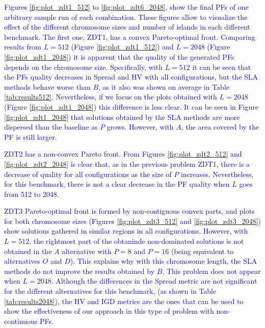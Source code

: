 \documentclass[preprint]{elsarticle}
\begin{document}
\textcolor{blue}{Figures \ref{fig:plot_zdt1_512} to
  \ref{fig:plot_zdt6_2048}, show the final PFs of one arbitrary sample
  run of each combination. %
  These figures allow to visualize the effect of the different
  chromosome sizes and number of islands in each different
  benchmark. The first one, ZDT1, has a convex Pareto-optimal
  front. Comparing results from $L=512$ (Figure
  \ref{fig:plot_zdt1_512}) and $L=2048$ (Figure
  \ref{fig:plot_zdt1_2048}) it is apparent that the quality of the
  generated PFs depends on the chromosome size. Specifically, with
  $L=512$ it can be seen that the PFs quality decreases in Spread and
  HV with all configurations, but the SLA methods behave worse than
  $B$, as it also was shown on average in Table
  \ref{tab:results512}. %
  Nevertheless, if we focus on the plots obtained with $L=2048$
  (Figure \ref{fig:plot_zdt1_2048}) this difference is less clear. It
  can be seen in Figure \ref{fig:plot_zdt1_2048} that solutions
  obtained by the SLA methods are more dispersed than the baseline as
  $P$ grows. However, with $A$, the area covered by the PF is still
  larger.} %

\textcolor{blue}{ZDT2 has a non-convex Pareto front. From Figures
  \ref{fig:plot_zdt2_512} and \ref{fig:plot_zdt2_2048} is clear
  that, %
  as in the previous problem ZDT1, there is a decrease of quality for
  all configurations as the size of $P$ increases.  Nevertheless, for
  this benchmark, there is not a clear decrease in the PF quality when
  $L$ goes from 512 to 2048.} 

\textcolor{blue}{ZDT3 Pareto-optimal front is formed by non-contiguous convex parts, and plots for both chromosome sizes (Figures \ref{fig:plot_zdt3_512} and \ref{fig:plot_zdt3_2048}) show solutions gathered in similar regions in all configurations. However, with $L=512$, the rightmost part of the obtaninde non-dominated solutions is not obtained in the $A$ alternative with $P=8$  and $P=16$ (being equivalent to alternatives $O$ and $D$). This explains why with this chromosome length, the SLA methods do not improve the results obtained by $B$. This problem does not appear when $L=2048$. Although the differences in the Spread metric are not significant for the different alternatives for this benchmark, (as shown in Table \ref{tab:results2048}), the HV and IGD metrics are the ones that can be used to show the effectiveness of our approach in this type of problem with non-continuous PFs.} 
\end{document}
